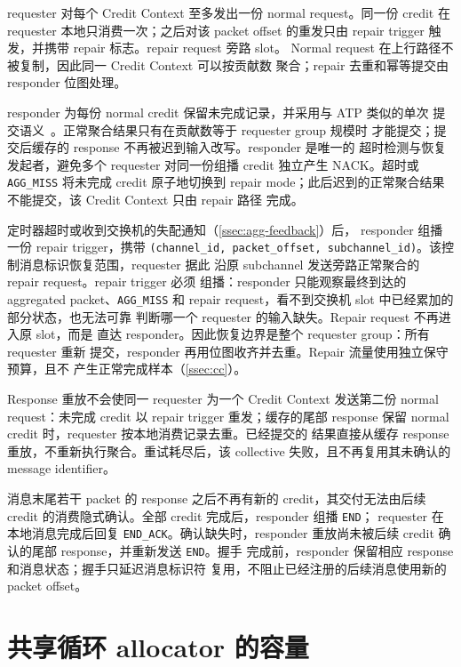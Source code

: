 requester 对每个 Credit Context 至多发出一份 normal request。同一份
credit 在 requester 本地只消费一次；之后对该 packet offset 的重发只由
repair trigger 触发，并携带 repair 标志。repair request 旁路 slot。
Normal request 在上行路径不被复制，因此同一 Credit Context 可以按贡献数
聚合；repair 去重和幂等提交由 responder 位图处理。

responder 为每份 normal credit 保留未完成记录，并采用与 ATP 类似的单次
提交语义~\cite{atp}。正常聚合结果只有在贡献数等于 requester group 规模时
才能提交；提交后缓存的 response 不再被迟到输入改写。responder 是唯一的
超时检测与恢复发起者，避免多个 requester 对同一份组播 credit 独立产生
NACK。超时或 \texttt{AGG\_MISS} 将未完成 credit 原子地切换到 repair
mode；此后迟到的正常聚合结果不能提交，该 Credit Context 只由 repair 路径
完成。

定时器超时或收到交换机的失配通知（\cref{ssec:agg-feedback}）后，
responder 组播一份 repair trigger，携带 \texttt{(channel\_id,
packet\_offset, subchannel\_id)}。该控制消息标识恢复范围，requester 据此
沿原 subchannel 发送旁路正常聚合的 repair request。repair trigger 必须
组播：responder 只能观察最终到达的 aggregated packet、\texttt{AGG\_MISS}
和 repair request，看不到交换机 slot 中已经累加的部分状态，也无法可靠
判断哪一个 requester 的输入缺失。Repair request 不再进入原 slot，而是
直达 responder。因此恢复边界是整个 requester group：所有 requester 重新
提交，responder 再用位图收齐并去重。Repair 流量使用独立保守预算，且不
产生正常完成样本（\cref{ssec:cc}）。

Response 重放不会使同一 requester 为一个 Credit Context 发送第二份
normal request：未完成 credit 以 repair trigger 重发；缓存的尾部
response 保留 normal credit 时，requester 按本地消费记录去重。已经提交的
结果直接从缓存 response 重放，不重新执行聚合。重试耗尽后，该 collective
失败，且不再复用其未确认的 message identifier。

消息末尾若干 packet 的 response 之后不再有新的 credit，其交付无法由后续
credit 的消费隐式确认。全部 credit 完成后，responder 组播 \texttt{END}；
requester 在本地消息完成后回复 \texttt{END\_ACK}。确认缺失时，responder
重放尚未被后续 credit 确认的尾部 response，并重新发送 \texttt{END}。握手
完成前，responder 保留相应 response 和消息状态；握手只延迟消息标识符
复用，不阻止已经注册的后续消息使用新的 packet offset。

\section{共享循环 allocator 的容量}
\label{ssec:bounded-state}
\label{sssec:slot-bound}


